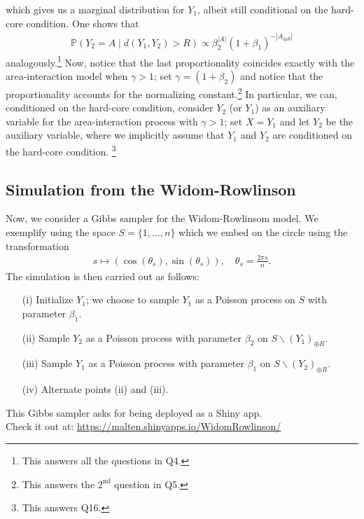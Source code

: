 \documentclass{article}
\begin{document}
which gives us a marginal distribution for $Y_1$, albeit still conditional on the hard-core condition. One shows that
\begin{align*}
    \mathbb{P}(Y_2 = A \mid d(Y_1,Y_2)>R) \propto\beta_2^{|A|} (1+\beta_1)^{-|A_{\oplus R}|}
\end{align*}
analogously.\footnote{This answers all the questions in Q4.}
Now, notice that the last proportionality coincides exactly with the area-interaction model when $\gamma > 1$; set $\gamma = (1 + \beta_2)$ and notice that the proportionality accounts for the normalizing constant.\footnote{This answers the $2^{\mathrm{nd}}$ question in Q5.}\newline\newline
In particular, we can, conditioned on the hard-core condition, consider $Y_2$ (or $Y_1$) as an auxiliary variable for the area-interaction process with $\gamma > 1$; set $X = Y_1$ and let $Y_2$ be the auxiliary variable, where we implicitly assume that $Y_1$ and $Y_2$ are conditioned on the hard-core condition. \footnote{This answers Q16.}
\subsection{Simulation from the Widom-Rowlinson}
Now, we consider a Gibbs sampler for the Widom-Rowlinsom model. We exemplify using the space $S = \{1,\dots, n\}$ which we embed on the circle using the transformation 
\begin{align*}
    s \mapsto (\cos(\theta_s), \sin(\theta_s)), \quad \theta_s = \frac{2\pi s}{n}.
\end{align*}
The simulation is then carried out as follows: 
\begin{itemize}
    \item[(i)] Initialize $Y_1$; we choose to sample $Y_1$ as a Poisson process on $S$ with parameter $\beta_1$.
    \item[(ii)] Sample $Y_2$ as a Poisson process with parameter $\beta_2$ on $S\backslash (Y_{1})_{\oplus R}$. 
    \item[(iii)] Sample $Y_1$ as a Poisson process with parameter $\beta_1$ on $S\backslash (Y_{2})_{\oplus R}$.
    \item[(iv)] Alternate points (ii) and (iii).  
\end{itemize}
This Gibbs sampler asks for being deployed as a Shiny app.\\
Check it out at: \url{https://malten.shinyapps.io/WidomRowlinson/}

%
\end{document}

